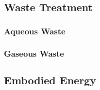 



\subsection{Waste Treatment}

\subsubsection{Aqueous Waste}


\subsubsection{Gaseous Waste}

\subsection{Embodied Energy}